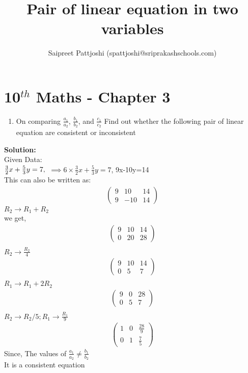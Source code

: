 \documentclass[12pt]{article}
\title{Pair of linear equation in two variables}
\author{Saipreet Pattjoshi (spattjoshi@sriprakashschools.com)}
\newcommand{\myvec}[1]{\ensuremath{\begin{pmatrix}#1\end{pmatrix}}}
\newcommand{\solution}{\noindent \textbf{Solution: }}
\begin{document}
\maketitle
\section*{10$^{th}$ Maths - Chapter 3}
\begin{enumerate}
\item  On comparing $\frac{a_1}{a_2}$, $\frac{b_1}{b_2}$, and $\frac{c_1}{c_2} $
Find out whether the following pair of linear equation are consistent or inconsistent\\
\end{enumerate}
\solution \\
Given Data:\\
$\frac{3}{2}x + \frac{5}{3}y=7,\\$
$\implies 6 \times \frac{3}{2}x + \frac{5}{3}y=7$,
9x-10y=14\\
This can also be written as:
\begin{align}
\myvec{9&10&14\\9&-10&14}
\end{align}
$R_2 \xrightarrow\ R_1 + R_2$\\ 
we get,
\begin{align}
\myvec{9&10&14\\0&20&28}\\
\end{align}
$R_2 \xrightarrow\ \frac{R_2}{4}$
\begin{align}
\myvec{9&10&14\\0&5&7}\\
\end{align}
$R_1 \xrightarrow\ R_1+2R_2$
\begin{align}
\myvec{9&0&28\\0&5&7}\\
\end{align}
$R_2 \xrightarrow\ R_2/5 ; R_1\xrightarrow\ \frac{R_1}{9}$\\
\begin{align}
\myvec{1&0&\frac{28}{9}\\0&1&\frac{7}{5}}
\end{align}
Since, The values of $\frac{a_1}{a_2} \neq \frac{b_1}{b_2}$\\
It is a consistent equation
\end{document}
